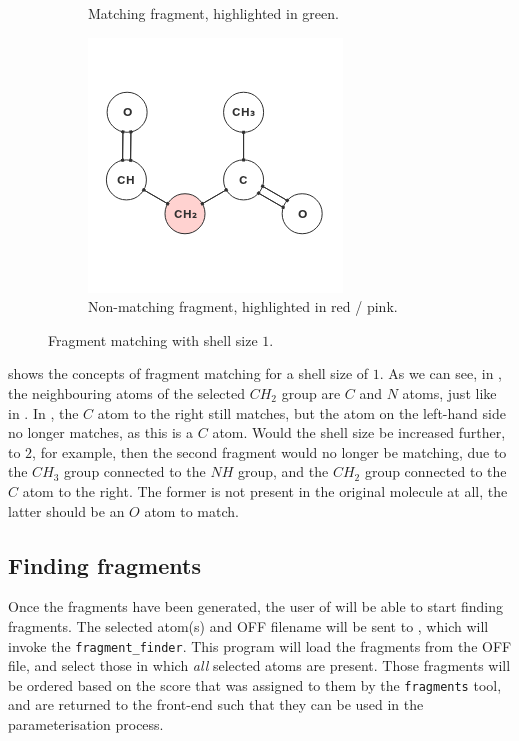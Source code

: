 \begin{figure}
\begin{subfigure}[t]{0.29\textwidth}
\caption{Matching fragment, highlighted in green.}
\end{subfigure}%
\qquad
\begin{subfigure}[t]{0.29\textwidth}
\centering
\includegraphics[width=\textwidth]{img/shell_3.png}
\caption{Non-matching fragment, highlighted in red / pink.}
\end{subfigure}
\caption{Fragment matching with shell size $1$.}
\end{figure}

 shows the concepts of fragment matching for a shell size of $1$. As we can see, in , the neighbouring atoms of the selected $CH_{2}$ group are $C$ and $N$ atoms, just like in . In , the $C$ atom to the right still matches, but the atom on the left-hand side no longer matches, as this is a $C$ atom. Would the shell size be increased further, to $2$, for example, then the second fragment would no longer be matching, due to the $CH_{3}$ group connected to the $NH$ group, and the $CH_{2}$ group connected to the $C$ atom to the right. The former is not present in the original molecule at all, the latter should be an $O$ atom to match.

\subsection{Finding fragments}
Once the fragments have been generated, the user of \oframp{} will be able to start finding fragments. The selected atom(s) and OFF filename will be sent to \omfraf, which will invoke the \verb|fragment_finder|. This program will load the fragments from the OFF file, and select those in which \emph{all} selected atoms are present. Those fragments will be ordered based on the score that was assigned to them by the \verb|fragments| tool, and are returned to the \oframp{} front-end such that they can be used in the parameterisation process.
